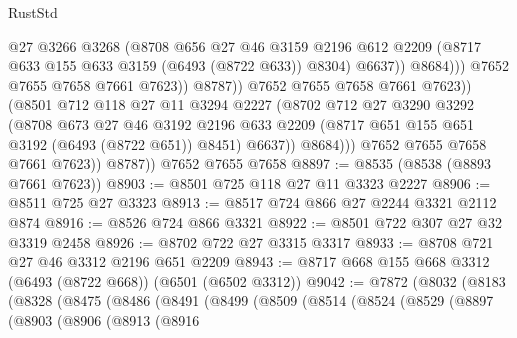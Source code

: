 \begin{lexlean}{RustStd}
\begin{coremodule}
                                    @27
                                    @3266
                                    @3268
                                    (@8708
                                      @656
                                      @27
                                      @46
                                      @3159
                                      @2196
                                      @612
                                      @2209
                                      (@8717 @633 @155 @633 @3159 (@6493 (@8722 @633)) @8304)
                                      @6637))
                                  @8684)))
                            @7652
                            @7655
                            @7658
                            @7661
                            @7623))
                        @8787))
                    @7652
                    @7655
                    @7658
                    @7661
                    @7623))
                (@8501
                  @712
                  @118
                  @27
                  @11
                  @3294
                  @2227
                  (@8702
                    @712
                    @27
                    @3290
                    @3292
                    (@8708
                      @673
                      @27
                      @46
                      @3192
                      @2196
                      @633
                      @2209
                      (@8717 @651 @155 @651 @3192 (@6493 (@8722 @651)) @8451)
                      @6637))
                  @8684)))
            @7652
            @7655
            @7658
            @7661
            @7623))
        @8787))
    @7652
    @7655
    @7658
@8897 := @8535 (@8538 (@8893 @7661 @7623))
@8903 := @8501 @725 @118 @27 @11 @3323 @2227
@8906 := @8511 @725 @27 @3323
@8913 := @8517 @724 @866 @27 @2244 @3321 @2112 @874
@8916 := @8526 @724 @866 @3321
@8922 := @8501 @722 @307 @27 @32 @3319 @2458
@8926 := @8702 @722 @27 @3315 @3317
@8933 := @8708 @721 @27 @46 @3312 @2196 @651 @2209
@8943 := @8717 @668 @155 @668 @3312 (@6493 (@8722 @668)) (@6501 (@6502 @3312))
@9042 := @7872
    (@8032
      (@8183
        (@8328
          (@8475
            (@8486
              (@8491
                (@8499
                  (@8509
                    (@8514
                      (@8524
                        (@8529
                          (@8897
                            (@8903
                              (@8906
                                (@8913
                                  (@8916

\end{coremodule}
\end{lexlean}
